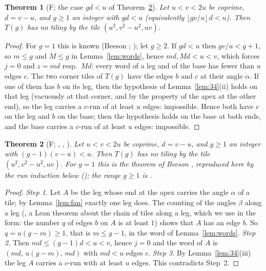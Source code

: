 \documentclass[11pt,reqno]{amsart}
\theoremstyle{plain}
\newtheorem{theorem}{Theorem}[section]
\theoremstyle{definition}
\newcommand{\sF}{\textup{\textsf{F}}}
\begin{document}
\begin{theorem}[\sF; the case $gd<u$ of Theorem~\ref{thm:Dprime}]\label{thm:C}
Let $u<v<2u$ be coprime, $d=v-u$, and $g\ge1$ an integer with $gd<u$ (equivalently $\lfloor gv/u\rfloor\, d<u$). Then $T(g)$ has no tiling by the tile $(u^2,v^2-u^2,uv)$.
\end{theorem}
\begin{proof}
For $g=1$ this is known (Beeson \cite[Thm.~11.7]{BeesonIso}; ); let $g\ge2$. If $gd<u$ then $gv/u<g+1$, so $m\le g$ and $M\le g$ in Lemma~\ref{lem:words}, hence $md,Md<u<v$, which forces $j=0$ and $z=md$ resp.\ $Md$: every
word of a leg and of the base has fewer than $u$ edges $c$. The two corner tiles of $T(g)$ have the edges $b$ and $c$ at their angle $\alpha$. If one of them has $b$ on its leg, then the hypothesis of Lemma~\ref{lem:34}(ii) holds on that leg (vacuously at that corner, and by the property of the apex at the other end),
so the leg carries a $c$-run of at least $u$ edges: impossible. Hence both have $c$ on the leg and $b$ on the base; then the hypothesis holds on the base at both ends, and the base carries a $c$-run of at least $u$ edges: impossible.
\end{proof}

\begin{theorem}[\sF; , , ]\label{thm:Dprime}
Let $u<v<2u$ be coprime, $d=v-u$, and $g\ge1$ an integer with $(g-1)(v-u)<u$. Then $T(g)$ has no tiling by the tile $(u^2,v^2-u^2,uv)$. For $g=1$ this is the theorem of Beeson \cite[Thm.~11.7]{BeesonIso}, reproduced here by the run induction below (); the range $g\ge1$ is .
\end{theorem}
\begin{proof}
\emph{Step 1.}\label{step:q1} Let $A$ be the leg whose end at the apex carries the angle $\alpha$ of a tile; by Lemma~\ref{lem:fan} exactly one leg does. The counting of the angles $\beta$ along a leg (, a Lean theorem about the chain of tiles along a leg, which we use in the form: the number $q$ of edges $b$ on $A$ is at least $1$)
shows that $A$ has an edge $b$. So $q=u(g-m)\ge1$, that is $m\le g-1$, in the word of Lemma~\ref{lem:words}.
\emph{Step 2.} Then $md\le(g-1)d<u<v$, hence $j=0$ and the word of $A$ is $(md,\,u(g-m),\,md)$ with $md<u$ edges $c$.
\emph{Step 3.} By Lemma~\ref{lem:34}(iii) the leg $A$ carries a $c$-run with at least $u$ edges. This contradicts Step~2.
\end{proof}
\end{document}
